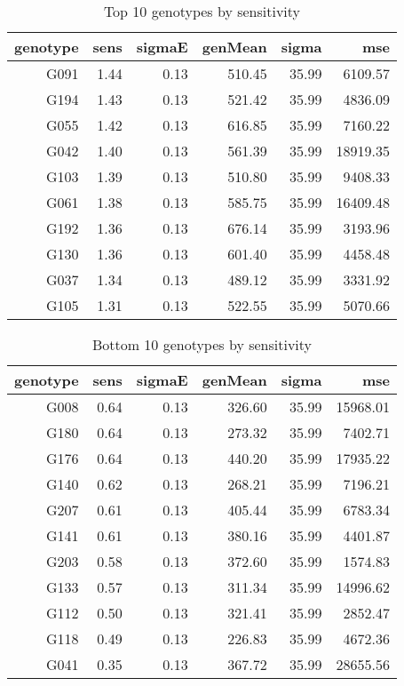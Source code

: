 \documentclass[a4paper,11pt]{article}\usepackage[]{graphicx}\usepackage[]{color}
\begin{document}
\begin{table}[ht]
\begin{flushleft}
\caption{Top 10 genotypes by sensitivity} 
\label{topEstimates}
\begin{tabular}{rrrrrr}
  \hline
genotype & sens & sigmaE & genMean & sigma & mse \\ 
  \hline
G091 & 1.44 & 0.13 & 510.45 & 35.99 & 6109.57 \\ 
  G194 & 1.43 & 0.13 & 521.42 & 35.99 & 4836.09 \\ 
  G055 & 1.42 & 0.13 & 616.85 & 35.99 & 7160.22 \\ 
  G042 & 1.40 & 0.13 & 561.39 & 35.99 & 18919.35 \\ 
  G103 & 1.39 & 0.13 & 510.80 & 35.99 & 9408.33 \\ 
  G061 & 1.38 & 0.13 & 585.75 & 35.99 & 16409.48 \\ 
  G192 & 1.36 & 0.13 & 676.14 & 35.99 & 3193.96 \\ 
  G130 & 1.36 & 0.13 & 601.40 & 35.99 & 4458.48 \\ 
  G037 & 1.34 & 0.13 & 489.12 & 35.99 & 3331.92 \\ 
  G105 & 1.31 & 0.13 & 522.55 & 35.99 & 5070.66 \\ 
   \hline
\end{tabular}
\end{flushleft}
\end{table}
\begin{table}[ht]
\begin{flushleft}
\caption{Bottom 10 genotypes by sensitivity} 
\label{bottomEstimates}
\begin{tabular}{rrrrrr}
  \hline
genotype & sens & sigmaE & genMean & sigma & mse \\ 
  \hline
G008 & 0.64 & 0.13 & 326.60 & 35.99 & 15968.01 \\ 
  G180 & 0.64 & 0.13 & 273.32 & 35.99 & 7402.71 \\ 
  G176 & 0.64 & 0.13 & 440.20 & 35.99 & 17935.22 \\ 
  G140 & 0.62 & 0.13 & 268.21 & 35.99 & 7196.21 \\ 
  G207 & 0.61 & 0.13 & 405.44 & 35.99 & 6783.34 \\ 
  G141 & 0.61 & 0.13 & 380.16 & 35.99 & 4401.87 \\ 
  G203 & 0.58 & 0.13 & 372.60 & 35.99 & 1574.83 \\ 
  G133 & 0.57 & 0.13 & 311.34 & 35.99 & 14996.62 \\ 
  G112 & 0.50 & 0.13 & 321.41 & 35.99 & 2852.47 \\ 
  G118 & 0.49 & 0.13 & 226.83 & 35.99 & 4672.36 \\ 
  G041 & 0.35 & 0.13 & 367.72 & 35.99 & 28655.56 \\ 
   \hline
\end{tabular}
\end{flushleft}
\end{table}

\end{document}

